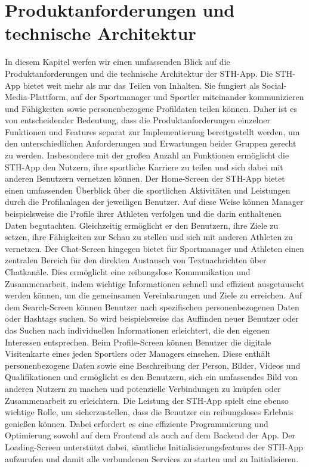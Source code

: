 \newpage
\chapter{Produktanforderungen und technische Architektur}

In diesem Kapitel werfen wir einen umfassenden Blick auf die Produktanforderungen und die technische Architektur der STH-App.
Die STH-App bietet weit mehr als nur das Teilen von Inhalten. Sie fungiert als Social-Media-Plattform, auf der Sportmanager und Sportler miteinander kommunizieren und Fähigkeiten sowie personenbezogene Profildaten teilen können. Daher ist es von entscheidender Bedeutung, dass die Produktanforderungen einzelner Funktionen und Features separat zur Implementierung bereitgestellt werden, um den unterschiedlichen Anforderungen und Erwartungen beider Gruppen gerecht zu werden.
Insbesondere mit der großen Anzahl an Funktionen ermöglicht die STH-App den Nutzern, ihre sportliche Karriere zu teilen und sich dabei mit anderen Benutzern vernetzen können.
Der Home-Screen der STH-App bietet einen umfassenden Überblick über die sportlichen Aktivitäten und Leistungen durch die Profilanlagen der jeweiligen Benutzer. Auf diese Weise können Manager beispielsweise die Profile ihrer Athleten verfolgen und die darin enthaltenen Daten begutachten. Gleichzeitig ermöglicht er den Benutzern, ihre Ziele zu setzen, ihre Fähigkeiten zur Schau zu stellen und sich mit anderen Athleten zu vernetzen.
Der Chat-Screen hingegen bietet für Sportmanager und Athleten einen zentralen Bereich für den direkten Austausch von Textnachrichten über Chatkanäle. Dies ermöglicht eine reibungslose Kommunikation und Zusammenarbeit, indem wichtige Informationen schnell und effizient ausgetauscht werden können, um die gemeinsamen Vereinbarungen und Ziele zu erreichen.
Auf dem Search-Screen können Benutzer nach spezifischen personenbezogenen Daten oder Hashtags suchen. So wird beispielsweise das Auffinden neuer Benutzer oder das Suchen nach individuellen Informationen erleichtert, die den eigenen Interessen entsprechen.
Beim Profile-Screen können Benutzer die digitale Visitenkarte eines jeden Sportlers oder Managers einsehen. Diese enthält personenbezogene Daten sowie eine Beschreibung der Person, Bilder, Videos und Qualifikationen und ermöglicht es den Benutzern, sich ein umfassendes Bild von anderen Nutzern zu machen und potenzielle Verbindungen zu knüpfen oder Zusammenarbeit zu erleichtern.
Die Leistung der STH-App spielt eine ebenso wichtige Rolle, um sicherzustellen, dass die Benutzer ein reibungsloses Erlebnis genießen können. Dabei erfordert es eine effiziente Programmierung und Optimierung sowohl auf dem Frontend als auch auf dem Backend der App. Der Loading-Screen unterstützt dabei, sämtliche Initialisierungsfeatures der STH-App aufzurufen und damit alle verbundenen Services zu starten und zu Initialisieren.
